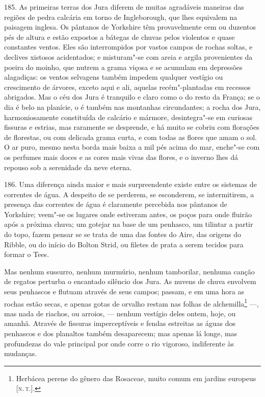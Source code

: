 185. As primeiras terras dos Jura diferem de muitas agradáveis maneiras
das regiões de pedra calcária em torno de Ingleborough, que lhes
equivalem na paisagem inglesa. Os pântanos de Yorkshire têm
provavelmente cem ou duzentos pés de altura e estão expostos a bátegas
de chuvas pelos violentos e quase constantes ventos. Eles são
interrompidos por vastos campos de rochas soltas, e declives xistosos
acidentados; e misturam"-se com areia e argila provenientes da poeira do
moinho, que nutrem a grama viçosa e se acumulam em depressões
alagadiças: os ventos selvagens também impedem qualquer vestígio ou
crescimento de árvores, exceto aqui e ali, aquelas recém"-plantadas em
recessos abrigados. Mas o céu dos Jura é tranquilo e claro como o do
resto da França; se o dia é belo na planície, o é também nas montanhas
circundantes; a rocha dos Jura, harmoniosamente constituída de calcário
e mármore, desintegra"-se em curiosas fissuras e estrias, mas raramente
se desprende, e há muito se cobriu com florações de florestas, ou com
delicada grama curta, e com todas as flores que amam o sol. O ar puro,
mesmo nesta borda mais baixa a mil pés acima do mar, enche"-se com os
perfumes mais doces e as cores mais vivas das flores, e o inverno lhes
dá repouso sob a serenidade da neve eterna.

186. Uma diferença ainda maior e mais surpreendente existe entre os
sistemas de correntes de água. A despeito de se perderem, se esconderem,
se intermitirem, a presença das correntes de água é claramente percebida
nos pântanos de Yorkshire; veem"-se os lugares onde estiveram antes, os
poços para onde fluirão após a próxima chuva; um gotejar na base de um
penhasco, um tilintar a partir do topo, fazem pensar se se trata de uma
das fontes do Aire, das origens do Ribble, ou do início do Bolton Strid,
ou filetes de prata a serem tecidos para formar o Tees.

Mas nenhum sussurro, nenhum murmúrio, nenhum tamborilar, nenhuma canção
de regatos perturba o encantado silêncio dos Jura. As nuvens de chuva
envolvem seus penhascos e flutuam através de seus campos; passam, e em
uma hora as rochas estão secas, e apenas gotas de orvalho restam nas
folhas de alchemilla\footnote{Herbácea perene do gênero das Rosaceae,
  muito comum em jardins europeus {[}\textsc{n.\,t.}{]}.} ---, mas nada de
riachos, ou arroios, --- nenhum vestígio deles ontem, hoje, ou amanhã.
Através de fissuras imperceptíveis e fendas estreitas as águas dos
penhascos e dos planaltos também desaparecem; mas apenas lá longe, mas
profundezas do vale principal por onde corre o rio vigoroso, indiferente
às mudanças.

